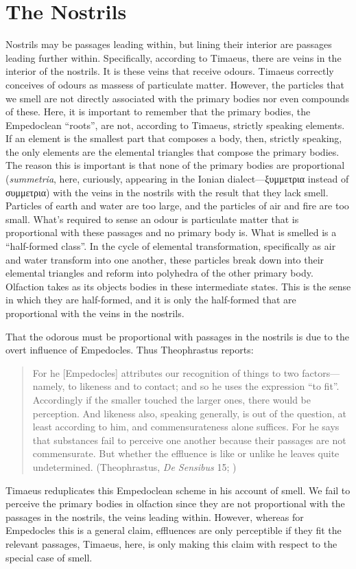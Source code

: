 
\section{The Nostrils} %
\label{sec:the_nostrils}

Nostrils may be passages leading within, but lining their interior are passages leading further within. Specifically, according to Timaeus, there are veins in the interior of the nostrils. It is these veins that receive odours. Timaeus correctly conceives of odours as massess of particulate matter. However, the particles that we smell are not directly associated with the primary bodies nor even compounds of these. Here, it is important to remember that the primary bodies, the Empedoclean ``roots'', are not, according to Timaeus, strictly speaking elements. If an element is the smallest part that composes a body, then, strictly speaking, the only elements are the elemental triangles that compose the primary bodies. The reason this is important is that none of the primary bodies are proportional (\emph{summetria}, here, curiously, appearing in the Ionian dialect---{\sbl ξυμμετρια} instead of {\sbl συμμετρια}) with the veins in the nostrils with the result that they lack smell. Particles of earth and water are too large, and the particles of air and fire are too small. What's required to sense an odour is particulate matter that is proportional with these passages and no primary body is. What is smelled is a ``half-formed class''. In the cycle of elemental transformation, specifically as air and water transform into one another, these particles break down into their elemental triangles and reform into polyhedra of the other primary body. Olfaction takes as its objects bodies in these intermediate states. This is the sense in which they are half-formed, and it is only the half-formed that are proportional with the veins in the nostrils.

That the odorous must be proportional with passages in the nostrils is due to the overt influence of Empedocles. Thus Theophrastus reports:
\begin{quote}
	For he [Empedocles] attributes our recognition of things to two factors---namely, to likeness and to contact; and so he uses the expression ``to fit''. Accordingly if the smaller touched the larger ones, there would be perception. And likeness also, speaking generally, is out of the question, at least according to him, and commensurateness alone suffices. For he says that substances fail to perceive one another because their passages are not commensurate. But whether the effluence is like or unlike he leaves quite undetermined. (Theophrastus, \emph{De Sensibus} 15; \citealt[79]{Stratton:1917vn})
\end{quote}
Timaeus reduplicates this Empedoclean scheme in his account of smell. We fail to perceive the primary bodies in olfaction since they are not proportional with the passages in the nostrils, the veins leading within. However, whereas for Empedocles this is a general claim, effluences are only perceptible if they fit the relevant passages, Timaeus, here, is only making this claim with respect to the special case of smell.

